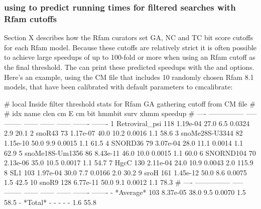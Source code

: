 \subsubsection{using  to predict running times for
  filtered searches with Rfam cutoffs}
Section X describes how the Rfam curators set GA, NC and TC bit score
cutoffs for each Rfam model. Because these cutoffs are relatively
strict it is often possible to achieve large speedups of up to
100-fold or more when using an Rfam cutoff as the final threshold. The
 can print these predicted speedups with the  and  options. Here's an example, using the
 CM file that includes 10 randomly chosen Rfam
8.1 models, that have been calibrated with default parameters to
cmcalibrate:


\begin{sreoutput}
# local Inside filter threshold stats for Rfam GA gathering cutoff from CM file
#
#  idx  name              clen      cm E  cm bit  hmmbit    surv     xhmm  speedup
# ----  ---------------  -----  --------  ------  ------  ------  -------  -------
     1  Retroviral_psi     118  1.19e-04    27.0     6.5  0.0324      2.9     20.1
     2  snoR43              73  1.17e-07    40.0    10.2  0.0016      1.1     58.6
     3  snoMe28S-U3344      82  1.15e-10    50.0     9.9  0.0015      1.1     61.5
     4  SNORD36             79  3.07e-04    28.0    11.1  0.0014      1.1     62.9
     5  snoMe18S-Um1356     86  8.43e-11    46.0    10.0  0.0015      1.1     60.0
     6  SNORND104           70  2.13e-06    35.0    10.5  0.0017      1.1     54.7
     7  HgcC               130  2.11e-04    24.0    10.9  0.0043      2.0    115.9
     8  SL1                103  1.97e-04    30.0     7.7  0.0166      2.0     30.2
     9  sroH               161  1.45e-12    50.0     8.6  0.0075      1.5     42.5
    10  snoR9              128  6.77e-11    50.0     9.1  0.0012      1.1     78.3
# ----  ---------------  -----  --------  ------  ------  ------  -------  -------
     -  *Average*          103  8.37e-05    38.0     9.5  0.0070      1.5     58.5
     -  *Total*              -         -       -       -       -      1.6     55.8
\end{sreoutput}

